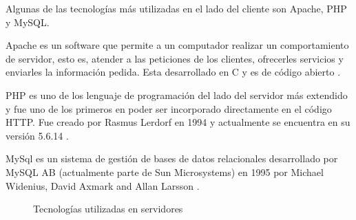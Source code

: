 Algunas de las tecnologías más utilizadas en el lado del cliente son Apache, PHP y MySQL.

Apache es un software que permite a un computador realizar un comportamiento de servidor, esto es, atender a las peticiones de los clientes, ofrecerles servicios y enviarles la información pedida. Esta desarrollado en C y es de código abierto \cite{Apac15}.

PHP es uno de los lenguaje de programación del lado del servidor más extendido y fue uno de los primeros en poder ser incorporado directamente en el código \ac{HTTP}. Fue creado por Rasmus Lerdorf en 1994 y actualmente se encuentra en su versión 5.6.14 \cite{Hist15}.

MySql es un sistema de gestión de bases de datos relacionales desarrollado por MySQL AB (actualmente parte de Sun Microsystems) en 1995 por Michael Widenius, David Axmark and Allan Larsson \cite{Data14}.

\begin{figure}[h!btp]
	\begin{adjustbox}{minipage=\linewidth, fbox}
		\centering
		\hspace{10mm}
		\vspace{10mm}
	\end{adjustbox}
	\caption{Tecnologías utilizadas en servidores}
	\label{fig:mysql_php_apache}
\end{figure}

